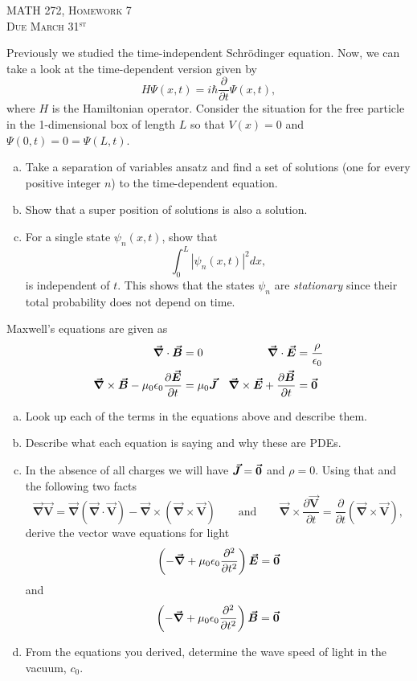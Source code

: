 \documentclass[12pt]{article} %
\newcommand{\grad}{\boldsymbol{\vec{\nabla}}}
\newcommand{\vecfieldE}{\boldsymbol{\vec{E}}}
\newcommand{\vecfieldB}{\boldsymbol{\vec{B}}}
\newcommand{\vecfieldJ}{\boldsymbol{\vec{J}}}
\newcommand{\vecfieldV}{\boldsymbol{\vec{V}}}
\newcommand{\veclaplace}{\boldsymbol{\vec{\nabla}}}
\begin{document}
\begin{center}
   \textsc{\large MATH 272, Homework 7}\\
   \textsc{Due March 31$^\textrm{st}$}
\end{center}
\vspace{.5cm}

\begin{problem}
Previously we studied the time-independent Schr\"odinger equation. Now, we can take a look at the time-dependent version given by
\[
H \Psi(x,t) = i\hbar \frac{\partial}{\partial t} \Psi(x,t),
\]
where $H$ is the Hamiltonian operator.  Consider the situation for the free particle in the 1-dimensional box of length $L$ so that $V(x)=0$ and $\Psi(0,t)=0=\Psi(L,t)$.  
\begin{enumerate}[(a)]
    \item Take a separation of variables ansatz and find a set of solutions (one for every positive integer $n$) to the time-dependent equation.
    \item Show that a super position of solutions is also a solution.
    \item For a single state $\psi_n(x,t)$, show that 
    \[
    \int_0^L \left|\psi_n(x,t)\right|^2 dx,
    \]
    is independent of $t$. This shows that the states $\psi_n$ are \emph{stationary} since their total probability does not depend on time.
\end{enumerate}
\end{problem}


\begin{problem}
Maxwell's equations are given as
\begin{align*}
\grad \cdot \vecfieldB &= 0  & \grad \cdot \vecfieldE &= \frac{\rho}{\epsilon_0}\\
\grad \times \vecfieldB -\mu_0 \epsilon_0\frac{\partial \vecfieldE}{\partial t}&=\mu_0 \vecfieldJ & \grad \times \vecfieldE + \frac{\partial \vecfieldB}{\partial t} &= \zerovec
\end{align*}
\begin{enumerate}[(a)]
    \item Look up each of the terms in the equations above and describe them.
    \item Describe what each equation is saying and why these are PDEs.
    \item In the absence of all charges we will have $\vecfieldJ=\zerovec$ and $\rho=0$.  Using that and the following two facts
    \[
    \veclaplace \vecfieldV = \grad (\grad \cdot \vecfieldV) - \grad \times (\grad \times \vecfieldV) \qquad \textrm{and} \qquad \grad \times \frac{\partial \vecfieldV}{\partial t} = \frac{\partial}{\partial t} (\grad \times \vecfieldV),
    \]
    derive the vector wave equations for light
    \[
    \left( - \veclaplace + \mu_0 \epsilon_0 \frac{\partial^2 }{\partial t^2}\right) \vecfieldE = \zerovec
    \]
    and
    \[
    \left( - \veclaplace + \mu_0 \epsilon_0 \frac{\partial^2 }{\partial t^2}\right) \vecfieldB = \zerovec
    \]
    \item From the equations you derived, determine the wave speed of light in the vacuum, $c_0$.
\end{enumerate}
\end{problem}
\end{document}
